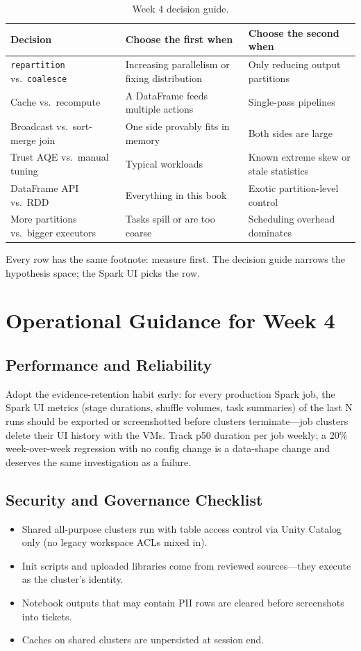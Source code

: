 \begin{table}[H]
\centering
\small
\begin{tabular}{@{}p{3.4cm}p{4.4cm}p{4.6cm}@{}}
\toprule
\textbf{Decision} & \textbf{Choose the first when} & \textbf{Choose the second when} \\
\midrule
\texttt{repartition} vs.\ \texttt{coalesce} & Increasing parallelism or fixing distribution & Only reducing output partitions \\
Cache vs.\ recompute & A DataFrame feeds multiple actions & Single-pass pipelines \\
Broadcast vs.\ sort-merge join & One side provably fits in memory & Both sides are large \\
Trust AQE vs.\ manual tuning & Typical workloads & Known extreme skew or stale statistics \\
DataFrame API vs.\ RDD & Everything in this book & Exotic partition-level control \\
More partitions vs.\ bigger executors & Tasks spill or are too coarse & Scheduling overhead dominates \\
\bottomrule
\end{tabular}
\caption{Week 4 decision guide.}
\label{tab:ch4-decisions}
\end{table}

Every row has the same footnote: measure first. The decision guide narrows the hypothesis space; the Spark UI picks the row.

\section{Operational Guidance for Week 4}
%
\subsection{Performance and Reliability}
Adopt the evidence-retention habit early: for every production Spark job, the Spark UI metrics (stage durations, shuffle volumes, task summaries) of the last N runs should be exported or screenshotted before clusters terminate---job clusters delete their UI history with the VMs. Track p50 duration per job weekly; a 20\% week-over-week regression with no config change is a data-shape change and deserves the same investigation as a failure.

\subsection{Security and Governance Checklist}
\begin{itemize}
    \item Shared all-purpose clusters run with table access control via Unity Catalog only (no legacy workspace ACLs mixed in).
    \item Init scripts and uploaded libraries come from reviewed sources---they execute as the cluster's identity.
    \item Notebook outputs that may contain PII rows are cleared before screenshots into tickets.
    \item Caches on shared clusters are unpersisted at session end.
\end{itemize}

